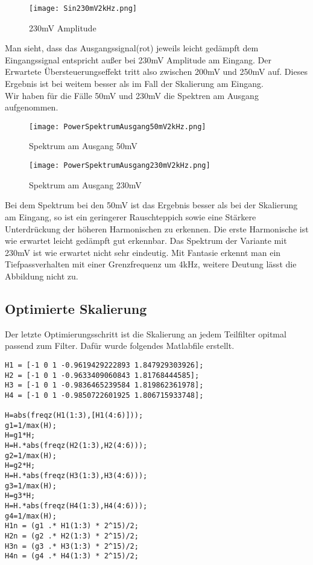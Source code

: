 \begin{figure}[H]
  \centering
    \texttt{[image: Sin230mV2kHz.png]}
  \caption{230mV Amplitude}
  \label{fig:Sin230mV2kHz}
\end{figure}
Man sieht, dass das Ausgangssignal(rot) jeweils leicht gedämpft dem Eingangssignal entspricht außer bei 230mV Amplitude am Eingang. Der Erwartete Übersteuerungseffekt tritt also zwischen 200mV und 250mV auf. Dieses Ergebnis ist bei weitem besser als im Fall der Skalierung am Eingang.\\
Wir haben für die Fälle 50mV und 230mV die Spektren am Ausgang aufgenommen.\\
\begin{figure}[H]
  \centering
    \texttt{[image: PowerSpektrumAusgang50mV2kHz.png]}
  \caption{Spektrum am Ausgang 50mV}
  \label{fig:PowerSpektrumAusgang50mV2kHz}
\end{figure}
\begin{figure}[H]
  \centering
    \texttt{[image: PowerSpektrumAusgang230mV2kHz.png]}
  \caption{Spektrum am Ausgang 230mV}
  \label{fig:PowerSpektrumAusgang230mV2kHz}
\end{figure}
Bei dem Spektrum bei den 50mV ist das Ergebnis besser als bei der Skalierung am Eingang, so ist ein geringerer Rauschteppich sowie eine Stärkere Unterdrückung der höheren Harmonischen zu erkennen. Die erste Harmonische ist wie erwartet leicht gedämpft gut erkennbar. Das Spektrum der Variante mit 230mV ist wie erwartet nicht sehr eindeutig. Mit Fantasie erkennt man ein Tiefpassverhalten mit einer Grenzfrequenz um 4kHz, weitere Deutung lässt die Abbildung nicht zu.

\subsection{Optimierte Skalierung}
Der letzte Optimierungsschritt ist die Skalierung an jedem Teilfilter opitmal passend zum Filter.
Dafür wurde folgendes Matlabfile erstellt.\\
\begin{adjustbox}{}
 \begin{lstlisting}[title=optimierung.m]
 H1 = [-1 0 1 -0.9619429222893 1.847929303926];
H2 = [-1 0 1 -0.9633409060843 1.81768444585];
H3 = [-1 0 1 -0.9836465239584 1.819862361978];
H4 = [-1 0 1 -0.9850722601925 1.806715933748];

H=abs(freqz(H1(1:3),[H1(4:6)]));
g1=1/max(H);
H=g1*H;
H=H.*abs(freqz(H2(1:3),H2(4:6)));
g2=1/max(H);
H=g2*H;
H=H.*abs(freqz(H3(1:3),H3(4:6)));
g3=1/max(H);
H=g3*H;
H=H.*abs(freqz(H4(1:3),H4(4:6)));
g4=1/max(H);
H1n = (g1 .* H1(1:3) * 2^15)/2;
H2n = (g2 .* H2(1:3) * 2^15)/2;
H3n = (g3 .* H3(1:3) * 2^15)/2;
H4n = (g4 .* H4(1:3) * 2^15)/2;
\end{lstlisting}
\end{adjustbox}

